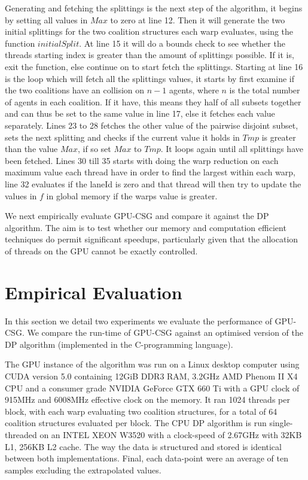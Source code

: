 \documentclass[a4paper, 12pt]{report}
\begin{document}
Generating and fetching the splittings is the next step of the algorithm, it
begins by setting all values in $Max$ to zero at line 12.
Then it will generate the two initial splittings for the two coalition
structures each warp evaluates,
using the function $initialSplit$.
At line 15 it will do a bounds check to see whether the threads starting index
is greater than the amount of splittings possible.
If it is, exit the function, else continue on to start fetch the splittings.
Starting at line 16 is the loop which will fetch all the splittings values, it
starts by first examine if
the two coalitions have an collision on $n-1$ agents, where $n$ is the total
number of agents in each coalition.
If it have, this means they half of all subsets together and can thus be set to
the same value in line 17,
else it fetches each value separately.
Lines 23 to 28 fetches the other value of the pairwise disjoint subset, sets the
next splitting and checks if the current value it holds in $Tmp$ is greater than
the value $Max$, if so set $Max$ to $Tmp$. It loops again until all splittings
have been fetched.
Lines 30 till 35 starts with doing the warp reduction on each maximum value each
thread have in order to find the largest within each warp,
line 32 evaluates if the laneId is zero and that thread will then try to update
the values in $f$ in global memory if the warps value is greater.

We next empirically evaluate GPU-CSG and compare it against the DP algorithm.
The aim is to test whether our memory and computation efficient techniques do
permit significant speedups, particularly given that the allocation of threads
on the GPU cannot be exactly controlled.


\section{Empirical Evaluation}
In this section we detail two experiments we evaluate the performance of
GPU-CSG. We compare the run-time of GPU-CSG against an optimised version of the
DP algorithm (implemented in the C-programming language).


The GPU instance of the algorithm was run on a Linux desktop computer using CUDA
version 5.0 containing 12GiB DDR3 RAM,  3.2GHz AMD Phenom II X4 CPU and a
consumer grade NVIDIA GeForce GTX 660 Ti with a GPU clock of 915MHz and 6008MHz
effective clock on the memory.
It ran 1024 threads per block, with each warp evaluating two coalition
structures, 
for a total of 64 coalition structures evaluated per block.
The CPU DP algorithm is run single-threaded on an INTEL XEON W3520 with a
clock-speed of 2.67GHz with 32KB L1, 256KB L2 cache.  The way the data is
structured and stored is identical between both implementations. Final, each
data-point were an average of ten samples excluding the extrapolated values. 
\end{document}
